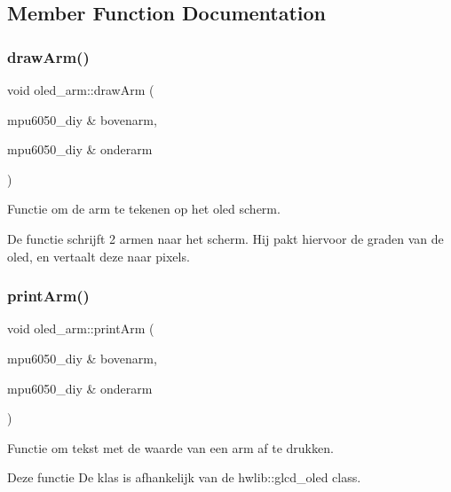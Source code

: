 \subsection{Member Function Documentation}
\mbox{\label{classoled__arm_a5d43e95edefb6f7fc363f4da8d1c3b1e}} 
\subsubsection{\texorpdfstring{draw\+Arm()}{drawArm()}}
{\footnotesize\ttfamily void oled\+\_\+arm\+::draw\+Arm (\begin{DoxyParamCaption}\item[{mpu6050\+\_\+diy \&}]{bovenarm,  }\item[{mpu6050\+\_\+diy \&}]{onderarm }\end{DoxyParamCaption})\hspace{0.3cm}{\ttfamily [inline]}}



Functie om de arm te tekenen op het oled scherm. 

De functie schrijft 2 armen naar het scherm. Hij pakt hiervoor de graden van de oled, en vertaalt deze naar pixels. \mbox{\label{classoled__arm_a1703c08a80dd80a30fdaad12694af74f}} 
\subsubsection{\texorpdfstring{print\+Arm()}{printArm()}}
{\footnotesize\ttfamily void oled\+\_\+arm\+::print\+Arm (\begin{DoxyParamCaption}\item[{mpu6050\+\_\+diy \&}]{bovenarm,  }\item[{mpu6050\+\_\+diy \&}]{onderarm }\end{DoxyParamCaption})\hspace{0.3cm}{\ttfamily [inline]}}



Functie om tekst met de waarde van een arm af te drukken. 

Deze functie De klas is afhankelijk van de hwlib\+::glcd\+\_\+oled class. \mbox{\label{classoled__arm_ae5eecd55d90a5c6137bfc4cef0cbcb2f}} 
